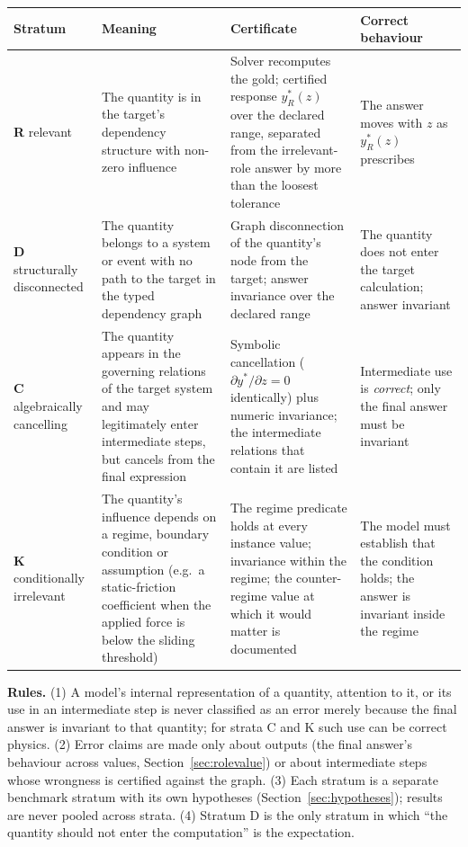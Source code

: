 \documentclass[10pt,a4paper]{article}
\begin{document}
\begin{center}\small
\begin{tabularx}{\linewidth}{@{}P{2.6cm}LLL@{}}
\toprule
Stratum & Meaning & Certificate & Correct behaviour \\
\midrule
\textbf{R} relevant & The quantity is in the target's dependency structure with non-zero influence &
Solver recomputes the gold; certified response $y^*_R(z)$ over the declared range, separated from the irrelevant-role answer by more than the loosest tolerance &
The answer moves with $z$ as $y^*_R(z)$ prescribes \\
\textbf{D} structurally disconnected & The quantity belongs to a system or event with no path to the target in the typed dependency graph &
Graph disconnection of the quantity's node from the target; answer invariance over the declared range &
The quantity does not enter the target calculation; answer invariant \\
\textbf{C} algebraically cancelling & The quantity appears in the governing relations of the target system and may legitimately enter intermediate steps, but cancels from the final expression &
Symbolic cancellation ($\partial y^*/\partial z=0$ identically) plus numeric invariance; the intermediate relations that contain it are listed &
Intermediate use is \emph{correct}; only the final answer must be invariant \\
\textbf{K} conditionally irrelevant & The quantity's influence depends on a regime, boundary condition or assumption (e.g.\ a static-friction coefficient when the applied force is below the sliding threshold) &
The regime predicate holds at every instance value; invariance within the regime; the counter-regime value at which it would matter is documented &
The model must establish that the condition holds; the answer is invariant inside the regime \\
\bottomrule
\end{tabularx}
\end{center}

\textbf{Rules.} (1) A model's internal representation of a quantity, attention to it, or its use in an
intermediate step is never classified as an error merely because the final answer is invariant to that quantity;
for strata C and K such use can be correct physics. (2) Error claims are made only about outputs (the final
answer's behaviour across values, Section~\ref{sec:rolevalue}) or about intermediate steps whose wrongness is
certified against the graph. (3) Each stratum is a separate benchmark stratum with its own hypotheses
(Section~\ref{sec:hypotheses}); results are never pooled across strata. (4) Stratum D is the only stratum in
which ``the quantity should not enter the computation'' is the expectation.
\end{document}
